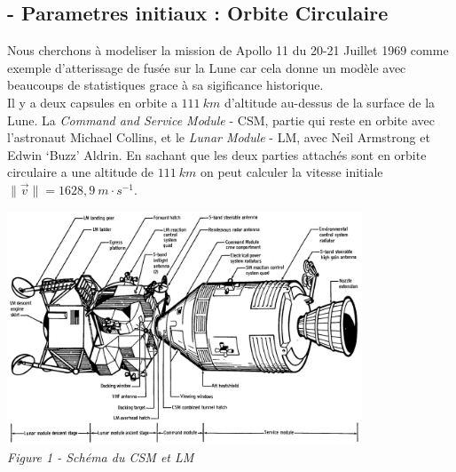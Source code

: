 \documentclass[a4paper, 12pt]{scrartcl}
\begin{document}
\subsection{- Parametres initiaux : Orbite Circulaire}
Nous cherchons à modeliser la mission de Apollo 11 du 20-21 Juillet 1969 comme exemple d'atterissage
de fusée sur la Lune car cela donne un modèle avec beaucoups de statistiques grace à sa sigificance 
historique. 
\\
Il y a deux capsules en orbite a $111\ km$ d'altitude au-dessus de la surface de la Lune. La \emph{Command and Service Module} - CSM,
partie qui reste en orbite avec l'astronaut Michael Collins, et le \emph{Lunar Module} - LM, avec Neil Armstrong et Edwin `Buzz' Aldrin.
En sachant que les deux parties attachés sont en orbite circulaire a une altitude de $111\ km$ on peut calculer
la vitesse initiale $\| \overrightarrow{v} \| = 1628,9\ m\cdot s^{-1}$. 

\begin{center}
\includegraphics[width=300pt]{CSM+LM_Schema}
\\
\vspace{5mm}
\emph{Figure 1 - Schéma du CSM et LM}
\end{center}
\end{document}
